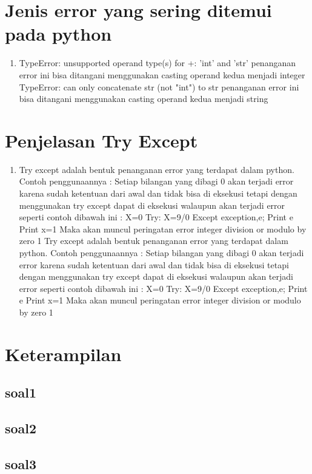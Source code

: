 \section{Jenis error yang sering ditemui pada python}
\begin{enumerate}
\item
TypeError: unsupported operand type(s) for +: 'int' and 'str'
penanganan error ini bisa ditangani menggunakan casting operand kedua menjadi integer
TypeError: can only concatenate str (not "int") to str
penanganan error ini bisa ditangani menggunakan casting operand kedua menjadi string
\end{enumerate}
\section{Penjelasan Try Except}
\begin{enumerate}
\item
Try except adalah bentuk penanganan error yang terdapat dalam python.
Contoh penggunaannya :
Setiap bilangan yang dibagi 0 akan terjadi error karena sudah ketentuan dari awal dan tidak bisa di eksekusi tetapi dengan menggunakan try except dapat di eksekusi walaupun akan terjadi error seperti contoh dibawah ini :
X=0
Try:
X=9/0
Except exception,e;
Print e
Print x=1
Maka akan muncul peringatan error integer division or modulo by zero 1
Try except adalah bentuk penanganan error yang terdapat dalam python.
Contoh penggunaannya :
Setiap bilangan yang dibagi 0 akan terjadi error karena sudah ketentuan dari awal dan tidak bisa di eksekusi tetapi dengan menggunakan try except dapat di eksekusi walaupun akan terjadi error seperti contoh dibawah ini :
X=0
Try:
X=9/0
Except exception,e;
Print e
Print x=1
Maka akan muncul peringatan error integer division or modulo by zero 1
\end{enumerate}


\section{Keterampilan}
\subsection{soal1}

\subsection{soal2}

\subsection{soal3}


